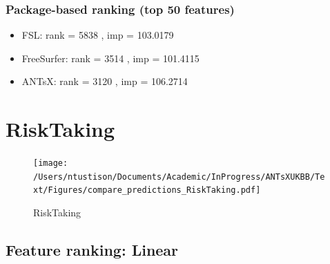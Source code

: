 \documentclass[
  10pt,
]{article}
\begin{document}
\hypertarget{package-based-ranking-top-50-features-7}{%
\subsubsection{Package-based ranking (top 50
features)}\label{package-based-ranking-top-50-features-7}}

\begin{itemize}
\item
  FSL: rank = 5838 , imp = 103.0179
\item
  FreeSurfer: rank = 3514 , imp = 101.4115
\item
  ANTsX: rank = 3120 , imp = 106.2714
\end{itemize}

\clearpage

\hypertarget{risktaking}{%
\section{RiskTaking}\label{risktaking}}

\begin{figure}
\centering
\texttt{[image: /Users/ntustison/Documents/Academic/InProgress/ANTsXUKBB/Text/Figures/compare\_predictions\_RiskTaking.pdf]}
\caption{RiskTaking}
\end{figure}

\hypertarget{feature-ranking-linear-8}{%
\subsection{Feature ranking: Linear}\label{feature-ranking-linear-8}}
\end{document}
